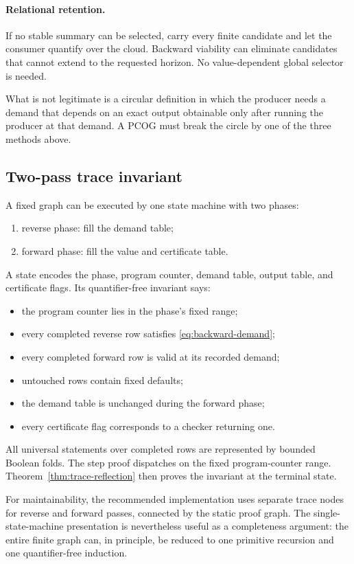 \paragraph{Relational retention.}
If no stable summary can be selected, carry every finite candidate and let the
consumer quantify over the cloud.  Backward viability can eliminate candidates
that cannot extend to the requested horizon.  No value-dependent global
selector is needed.

What is not legitimate is a circular definition in which the producer needs a
demand that depends on an exact output obtainable only after running the
producer at that demand.  A PCOG must break the circle by one of the three
methods above.

\subsection{Two-pass trace invariant}

A fixed graph can be executed by one state machine with two phases:
\begin{enumerate}
\item reverse phase: fill the demand table;
\item forward phase: fill the value and certificate table.
\end{enumerate}
A state encodes the phase, program counter, demand table, output table, and
certificate flags.  Its quantifier-free invariant says:

\begin{itemize}
\item the program counter lies in the phase's fixed range;
\item every completed reverse row satisfies \eqref{eq:backward-demand};
\item every completed forward row is valid at its recorded demand;
\item untouched rows contain fixed defaults;
\item the demand table is unchanged during the forward phase;
\item every certificate flag corresponds to a checker returning one.
\end{itemize}

All universal statements over completed rows are represented by bounded
Boolean folds.  The step proof dispatches on the fixed program-counter range.
Theorem~\ref{thm:trace-reflection} then proves the invariant at the terminal
state.

For maintainability, the recommended implementation uses separate trace nodes
for reverse and forward passes, connected by the static proof graph.  The
single-state-machine presentation is nevertheless useful as a completeness
argument: the entire finite graph can, in principle, be reduced to one
primitive recursion and one quantifier-free induction.

